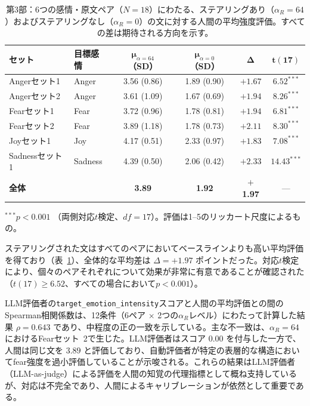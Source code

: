 \begin{table}[H]
\centering
\small
\begin{threeparttable}
\begin{tabular}{llcccc}
\toprule
\textbf{セット} & \textbf{目標感情} & $\boldsymbol{\mu}_{\alpha=64}$ \textbf{（SD）} & $\boldsymbol{\mu}_{\alpha=0}$ \textbf{（SD）} & $\boldsymbol{\Delta}$ & $\boldsymbol{t(17)}$ \\
\midrule
Angerセット1 & Anger   & 3.56 (0.86) & 1.89 (0.90) & $+1.67$ & $6.52^{***}$ \\
Angerセット2 & Anger   & 3.61 (1.09) & 1.67 (0.69) & $+1.94$ & $8.26^{***}$ \\
Fearセット1  & Fear    & 3.72 (0.96) & 1.78 (0.81) & $+1.94$ & $6.81^{***}$ \\
Fearセット2  & Fear    & 3.89 (1.18) & 1.78 (0.73) & $+2.11$ & $8.30^{***}$ \\
Joyセット1   & Joy     & 4.17 (0.51) & 2.33 (0.97) & $+1.83$ & $7.08^{***}$ \\
Sadnessセット1 & Sadness & 4.39 (0.50) & 2.06 (0.42) & $+2.33$ & $14.43^{***}$ \\
\midrule
\textbf{全体} & & \textbf{3.89} & \textbf{1.92} & $+$\textbf{1.97} & --- \\
\bottomrule
\end{tabular}
\begin{tablenotes}
\small
\item $^{***}p < 0.001$ （両側対応$t$検定、$\mathit{df}=17$）。評価は1--5のリッカート尺度によるもの。
\end{tablenotes}
\end{threeparttable}
\caption{第3部：6つの感情・原文ペア（$N = 18$）にわたる、ステアリングあり（$\alpha_R = 64$）およびステアリングなし（$\alpha_R = 0$）の文に対する人間の平均強度評価。すべての差は期待される方向を示す。}
\label{tab:human_eval_p3}
\end{table}

ステアリングされた文はすべてのペアにおいてベースラインよりも高い平均評価を得ており（表~\ref{tab:human_eval_p3}）、全体的な平均差は $\Delta = +1.97$ ポイントだった。対応$t$検定により、個々のペアそれぞれについて効果が非常に有意であることが確認された（$t(17) \geq 6.52$、すべての場合において$p < 0.001$）。\par

LLM評価者の\texttt{target\_emotion\_intensity}スコアと人間の平均評価との間のSpearman相関係数は、12条件（6ペア $\times$ 2つの$\alpha_R$レベル）にわたって計算した結果 $\rho = 0.643$ であり、中程度の正の一致を示している。主な不一致は、$\alpha_R = 64$におけるFearセット~2で生じた。LLM評価者はスコア $0.00$ を付与した一方で、人間は同じ文を $3.89$ と評価しており、自動評価者が特定の表層的な構造においてfear強度を過小評価していることが示唆される。これらの結果はLLM評価者（LLM-as-judge）による評価を人間の知覚の代理指標として概ね支持しているが、対応は不完全であり、人間によるキャリブレーションが依然として重要である。\par

